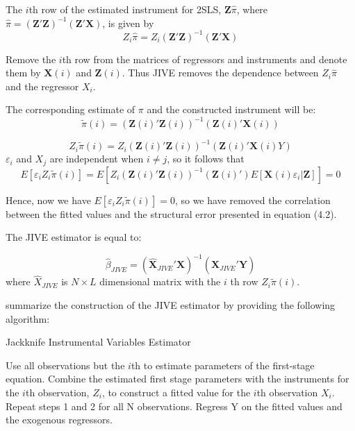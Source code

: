     
The $i$th row of the estimated instrument for 2SLS, $\mathbf Z\hat{\pi}$, where $\hat{\pi}=(\mathbf Z'\mathbf Z)^{-1}(\mathbf Z'\mathbf X)$, is given by
\begin{equation}
Z_{i}\hat{\pi}= Z_{i}({\mathbf Z}'\mathbf Z)^{-1}(\mathbf Z'\mathbf X)
\end{equation}
 
Remove the $i$th row from the matrices of regressors and instruments and denote them by $\mathbf X(i)$ and $\mathbf Z(i)$. Thus JIVE removes the dependence between $Z_{i}\hat{\pi}$ and the regressor $X_{i}$.

The corresponding estimate of $\pi$ and the constructed instrument will be:
\begin{equation}
\tilde{\pi}(i)=(\mathbf Z(i)'\mathbf Z(i))^{-1}(\mathbf Z(i)'\mathbf X(i))
\end{equation}

\begin{equation}
Z_{i}\tilde{\pi}(i)=Z_{i}(\mathbf Z(i)'\mathbf Z(i))^{-1}(\mathbf Z(i)'\mathbf X(i)Y)
\end{equation}
$\varepsilon_{i}$ and $X_{j}$ are independent when $i\neq j$, so it follows that
\begin{equation}
E[\varepsilon_{i}Z_{i}\tilde{\pi}(i)]=E[Z_{i}(\mathbf Z(i)'\mathbf Z(i))^{-1}(\mathbf Z(i)')E[\mathbf X(i)\varepsilon_{i}|\mathbf Z]]=0
\end{equation}

Hence, now we have $E[\varepsilon_{i}Z_{i}\tilde{\pi}(i)]=0$, so we have removed the correlation between the fitted values and the structural error presented in equation (4.2).
\par The JIVE estimator is equal to:

\begin{equation}
\hat{\beta}_{JIVE}=(\mathbf {\hat{X}}_{JIVE}'\mathbf X)^{-1}(\mathbf {\hat{X}}_{JIVE}'\mathbf Y)
\end{equation}
where $\hat{X}_{JIVE}$ is $N\times L$ dimensional matrix with the $i$ th row $Z_{i}\tilde{\pi}(i)$. \\


\par \cite{blomquist1999small} summarize the construction of the JIVE estimator by providing the following algorithm:  


\begin{algorithm}
\caption{Jackknife Instrumental Variables Estimator}\label{alg:euclid}
\begin{algorithmic}[1]
\State Use all observations but the $i$th to estimate parameters of the first-stage equation.
\State Combine the estimated first stage parameters with the instruments for the $i$th observation, $Z_i$, to construct a fitted value for the $i$th observation $X_i$.
\State Repeat steps 1 and 2 for all N observations.
\State Regress Y on the fitted values and the exogenous regressors.
\end{algorithmic}
\end{algorithm}

